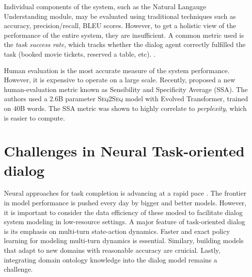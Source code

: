 \documentclass[11pt,a4paper]{article}
\begin{document}
Individual components of the system, such as the Natural Langauge Understanding module, may be evaluated using traditional techniques such as accuracy, precision/recall, BLEU scores. However, to get a holistic view of the performance of the entire system, they are insufficient. A common metric used is the \textit{task success rate}, which tracks whether the dialog agent correctly fulfilled the task (booked movie tickets, reserved a table, etc). \cite{Williams2007PartiallyOM}.

Human evaluation is the most accurate measure of the system performance. However, it is expensive to operate on a large scale. Recently, \cite{Adiwardana2020TowardsAH} proposed a new human-evaluation metric known as Sensibility and Specificity Average (SSA). The authors used a 2.6B parameter \textsc{Seq2Seq} model with Evolved Transformer, trained on 40B words. The SSA metric was shown to highly correlate to \textit{perplexity}, which is easier to compute.

\section{Challenges in Neural Task-oriented dialog}

Neural approaches for task completion is advancing at a rapid pace \cite{zhang2020recent}. The frontier in model performance is pushed every day by bigger and better models. However, it is important to consider the data efficiency of these modesl to facilitate dialog system modeling in low-resource settings. A major feature of task-oriented dialog is its emphasis on multi-turn state-action dynamics. Faster and exact policy learning for modeling multi-turn dynamics is essential. Similary, building models that adapt to new domains with reasonable accuracy are cruicial. Lastly, integrating domain ontology knowledge into the dialog model remains a challenge.

\nocite{*}

\end{document}
